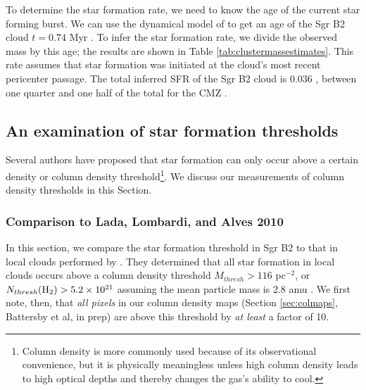 \documentclass[twocolumn]{aastex61}
\begin{document}
To determine the star formation rate, we need to know the age of the current
star forming burst.  We can use the dynamical model of \citet{Kruijssen2015a}
to get an age of the Sgr B2 cloud $t=0.74$ Myr \citep{Longmore2013a}.  To infer
the star formation rate, we divide the observed mass by this age; the results
are shown in
Table \ref{tab:clustermassestimates}.  This rate assumes that star formation was
initiated at the cloud's most recent pericenter passage.  The total inferred
SFR of the Sgr B2 cloud is 0.036 \msun \peryr, between one quarter and one
half of the total for the CMZ \citep{Longmore2013a,Barnes2017b}.


% 

\subsection{An examination of star formation thresholds}
Several authors \citep[e.g.,][]{Lada2010a,Heiderman2010a} have proposed that star
formation can only occur above a certain density or column density
threshold\footnote{Column
density is more commonly used because of its observational convenience, but it
is physically meaningless unless high column density leads to high optical
depths and thereby changes the gas's ability to cool.}. 
We discuss our measurements of column density thresholds in this Section.



\subsubsection{Comparison to Lada, Lombardi, and Alves 2010}
In this section, we compare the star formation threshold in Sgr B2 to that in
local clouds performed by \citet{Lada2010a}.  They determined that all star
formation in local clouds occurs above a column density threshold $M_{thresh} >
116$ \msun pc$^{-2}$, or $N_{thresh}(\textrm{H}_{2}) > 5.2\times10^{21}$ \persc assuming the
mean particle mass is 2.8 amu \citep{Kauffmann2008a}.  We first note, then,
that \emph{all pixels} in our column density maps (Section \ref{sec:colmaps},
Battersby et al, in prep) are above this threshold by \emph{at least} a factor
of 10.
\end{document}
